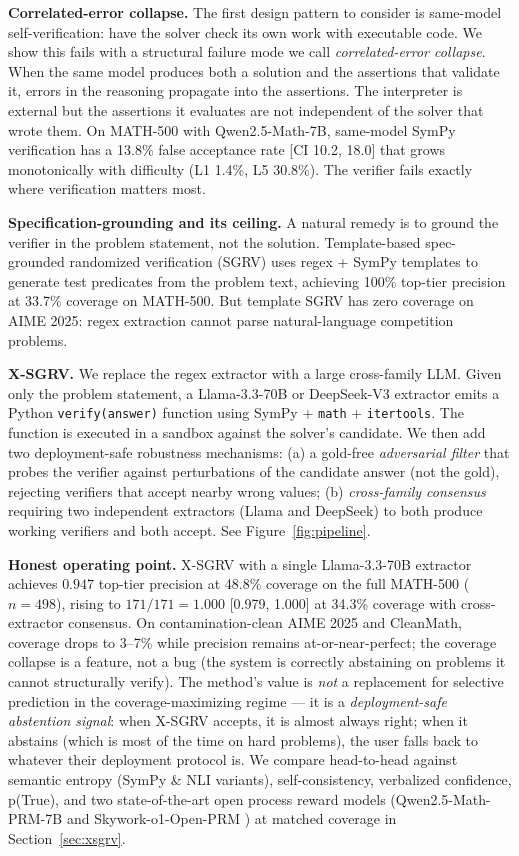 \documentclass{article}
\begin{document}
\textbf{Correlated-error collapse.} The first design pattern to consider is same-model self-verification: have the solver check its own work with executable code. We show this fails with a structural failure mode we call \emph{correlated-error collapse}. When the same model produces both a solution and the assertions that validate it, errors in the reasoning propagate into the assertions. The interpreter is external but the assertions it evaluates are not independent of the solver that wrote them. On MATH-500 with Qwen2.5-Math-7B, same-model SymPy verification has a 13.8\% false acceptance rate [CI 10.2, 18.0] that grows monotonically with difficulty (L1 1.4\%, L5 30.8\%). The verifier fails exactly where verification matters most.

\textbf{Specification-grounding and its ceiling.} A natural remedy is to ground the verifier in the problem statement, not the solution. Template-based spec-grounded randomized verification (SGRV) uses regex + SymPy templates to generate test predicates from the problem text, achieving 100\% top-tier precision at 33.7\% coverage on MATH-500. But template SGRV has zero coverage on AIME 2025: regex extraction cannot parse natural-language competition problems.

\textbf{X-SGRV.} We replace the regex extractor with a large cross-family LLM. Given only the problem statement, a Llama-3.3-70B or DeepSeek-V3 extractor emits a Python \texttt{verify(answer)} function using SymPy + \texttt{math} + \texttt{itertools}. The function is executed in a sandbox against the solver's candidate. We then add two deployment-safe robustness mechanisms: (a) a gold-free \emph{adversarial filter} that probes the verifier against perturbations of the candidate answer (not the gold), rejecting verifiers that accept nearby wrong values; (b) \emph{cross-family consensus} requiring two independent extractors (Llama and DeepSeek) to both produce working verifiers and both accept. See Figure~\ref{fig:pipeline}.

\textbf{Honest operating point.} X-SGRV with a single Llama-3.3-70B extractor achieves $0.947$ top-tier precision at 48.8\% coverage on the full MATH-500 ($n{=}498$), rising to $171/171 = 1.000$ [0.979, 1.000] at 34.3\% coverage with cross-extractor consensus. On contamination-clean AIME 2025 and CleanMath, coverage drops to 3--7\% while precision remains at-or-near-perfect; the coverage collapse is a feature, not a bug (the system is correctly abstaining on problems it cannot structurally verify). The method's value is \emph{not} a replacement for selective prediction in the coverage-maximizing regime --- it is a \emph{deployment-safe abstention signal}: when X-SGRV accepts, it is almost always right; when it abstains (which is most of the time on hard problems), the user falls back to whatever their deployment protocol is. We compare head-to-head against semantic entropy (SymPy \& NLI variants), self-consistency, verbalized confidence, p(True), and two state-of-the-art open process reward models (Qwen2.5-Math-PRM-7B \citep{qwenprm2025} and Skywork-o1-Open-PRM \citep{skyworkprm2024}) at matched coverage in Section~\ref{sec:xsgrv}.
\end{document}
